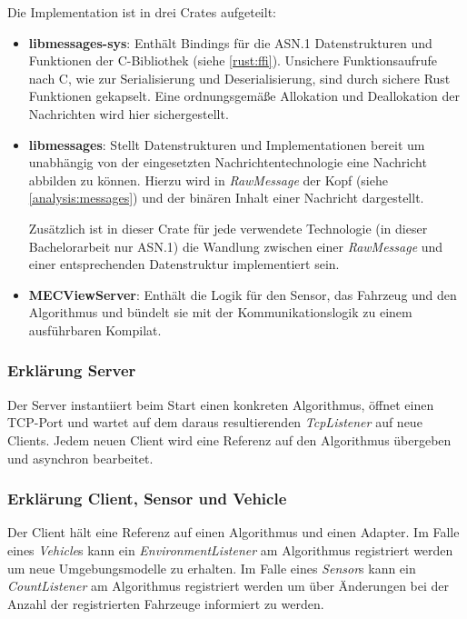 Die Implementation ist in drei Crates aufgeteilt:
\begin{itemize}
	\item \textbf{libmessages-sys}: Enthält Bindings für die ASN.1 Datenstrukturen und Funktionen der C-Bibliothek (siehe \autoref{rust:ffi}).
	Unsichere Funktionsaufrufe nach C, wie zur Serialisierung und Deserialisierung, sind durch sichere Rust Funktionen gekapselt.
	Eine ordnungsgemäße Allokation und Deallokation der Nachrichten wird hier sichergestellt.
	
	\item \textbf{libmessages}: Stellt Datenstrukturen und Implementationen bereit um unabhängig von der eingesetzten Nachrichtentechnologie eine Nachricht abbilden zu können.
	Hierzu wird in \textit{RawMessage} der Kopf (siehe \autoref{analysis:messages}) und der binären Inhalt einer Nachricht dargestellt.
	
	Zusätzlich ist in dieser Crate für jede verwendete Technologie (in dieser Bachelorarbeit nur ASN.1) die Wandlung zwischen einer \textit{RawMessage} und einer entsprechenden Datenstruktur implementiert sein.
	
	\item \textbf{MECViewServer}: Enthält die Logik für den Sensor, das Fahrzeug und den Algorithmus und bündelt sie mit der Kommunikationslogik zu einem ausführbaren Kompilat.
\end{itemize}

\subsubsection{Erklärung Server}

Der Server instantiiert beim Start einen konkreten Algorithmus, öffnet einen TCP-Port und wartet auf dem daraus resultierenden \textit{TcpListener} auf neue Clients.
Jedem neuen Client wird eine Referenz auf den Algorithmus übergeben und asynchron bearbeitet.

\subsubsection{Erklärung Client, Sensor und Vehicle}

Der Client hält eine Referenz auf einen Algorithmus und einen Adapter.
Im Falle eines \textit{Vehicle}s kann ein \textit{EnvironmentListener} am Algorithmus registriert werden um neue Umgebungsmodelle zu erhalten.
Im Falle eines \textit{Sensor}s kann ein \textit{CountListener} am Algorithmus registriert werden um über Änderungen bei der Anzahl der registrierten Fahrzeuge informiert zu werden.

